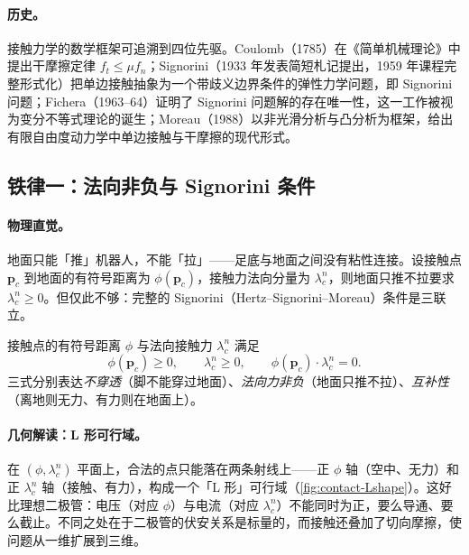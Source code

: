 \paragraph{历史。}
接触力学的数学框架可追溯到四位先驱。Coulomb（1785）在《简单机械理论》中提出干摩擦定律 $f_t\le\mu f_n$\cite{coulomb1785theorie}；Signorini（1933 年发表简短札记提出，1959 年课程完整形式化）把单边接触抽象为一个带歧义边界条件的弹性力学问题，即 Signorini 问题\cite{signorini1959questioni}；Fichera（1963--64）证明了 Signorini 问题解的存在唯一性，这一工作被视为变分不等式理论的诞生\cite{fichera1964problemi}；Moreau（1988）以非光滑分析与凸分析为框架，给出有限自由度动力学中单边接触与干摩擦的现代形式\cite{moreau1988unilateral}。

\subsection{铁律一：法向非负与 Signorini 条件}
\label{subsec:signorini}

\paragraph{物理直觉。}
地面只能「推」机器人，不能「拉」——足底与地面之间没有粘性连接。设接触点 $\boldsymbol{p}_c$ 到地面的有符号距离为 $\phi(\boldsymbol{p}_c)$，接触力法向分量为 $\lambda_c^n$，则地面只推不拉要求 $\lambda_c^n\ge0$。但仅此不够：完整的 Signorini（Hertz--Signorini--Moreau）条件是三联立。

\begin{definition}
\label{def:signorini}
接触点的有符号距离 $\phi$ 与法向接触力 $\lambda_c^n$ 满足
\begin{equation}
  \phi(\boldsymbol{p}_c)\ge0,\qquad \lambda_c^n\ge0,\qquad \phi(\boldsymbol{p}_c)\cdot\lambda_c^n=0.
  \label{eq:signorini}
\end{equation}
三式分别表达\emph{不穿透}（脚不能穿过地面）、\emph{法向力非负}（地面只推不拉）、\emph{互补性}（离地则无力、有力则在地面上）。
\end{definition}

\paragraph{几何解读：L 形可行域。}
在 $(\phi,\lambda_c^n)$ 平面上，合法的点只能落在两条射线上——正 $\phi$ 轴（空中、无力）和正 $\lambda_c^n$ 轴（接触、有力），构成一个「L 形」可行域（\cref{fig:contact-Lshape}）。这好比理想二极管：电压（对应 $\phi$）与电流（对应 $\lambda_c^n$）不能同时为正，要么导通、要么截止。不同之处在于二极管的伏安关系是标量的，而接触还叠加了切向摩擦，使问题从一维扩展到三维。

